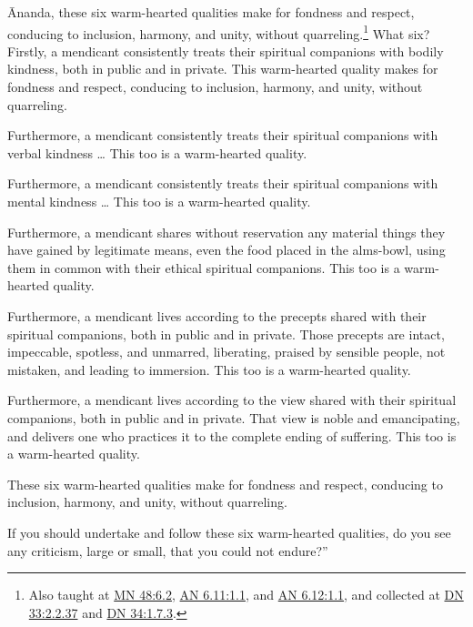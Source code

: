 \documentclass[12pt,openany]{book}%
\begin{document}
Ānanda, these six warm-hearted qualities make for fondness and respect, conducing to inclusion, harmony, and unity, without quarreling.\footnote{Also taught at \href{https://suttacentral.net/mn48/en/sujato\#6.2}{MN 48:6.2}, \href{https://suttacentral.net/an6.11/en/sujato\#1.1}{AN 6.11:1.1}, and \href{https://suttacentral.net/an6.12/en/sujato\#1.1}{AN 6.12:1.1}, and collected at \href{https://suttacentral.net/dn33/en/sujato\#2.2.37}{DN 33:2.2.37} and \href{https://suttacentral.net/dn34/en/sujato\#1.7.3}{DN 34:1.7.3}. } What six? Firstly, a mendicant consistently treats their spiritual companions with bodily kindness, both in public and in private. This warm-hearted quality makes for fondness and respect, conducing to inclusion, harmony, and unity, without quarreling. 

Furthermore, a mendicant consistently treats their spiritual companions with verbal kindness … This too is a warm-hearted quality. 

Furthermore, a mendicant consistently treats their spiritual companions with mental kindness … This too is a warm-hearted quality. 

Furthermore, a mendicant shares without reservation any material things they have gained by legitimate means, even the food placed in the alms-bowl, using them in common with their ethical spiritual companions. This too is a warm-hearted quality. 

Furthermore, a mendicant lives according to the precepts shared with their spiritual companions, both in public and in private. Those precepts are intact, impeccable, spotless, and unmarred, liberating, praised by sensible people, not mistaken, and leading to immersion. This too is a warm-hearted quality. 

Furthermore, a mendicant lives according to the view shared with their spiritual companions, both in public and in private. That view is noble and emancipating, and delivers one who practices it to the complete ending of suffering. This too is a warm-hearted quality. 

These six warm-hearted qualities make for fondness and respect, conducing to inclusion, harmony, and unity, without quarreling. 

If you should undertake and follow these six warm-hearted qualities, do you see any criticism, large or small, that you could not endure?” 
\end{document}
